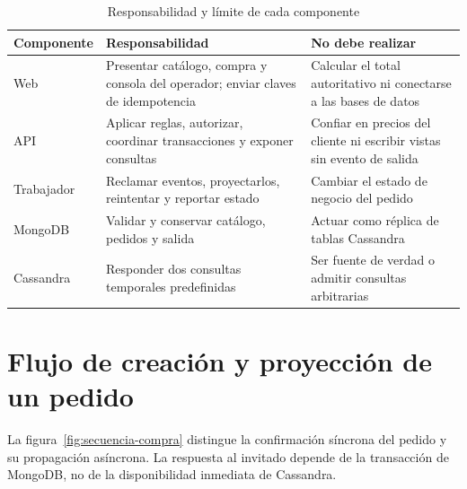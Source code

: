 \begin{table}[H]
  \centering
  \caption{Responsabilidad y límite de cada componente}
  \label{tab:componentes}
  \begin{tabularx}{\textwidth}{@{}p{3.2cm}YY@{}}
    \toprule
    \textbf{Componente} & \textbf{Responsabilidad} & \textbf{No debe realizar} \\
    \midrule
    Web & Presentar catálogo, compra y consola del operador; enviar claves de idempotencia & Calcular el total autoritativo ni conectarse a las bases de datos \\
    API & Aplicar reglas, autorizar, coordinar transacciones y exponer consultas & Confiar en precios del cliente ni escribir vistas sin evento de salida \\
    Trabajador & Reclamar eventos, proyectarlos, reintentar y reportar estado & Cambiar el estado de negocio del pedido \\
    MongoDB & Validar y conservar catálogo, pedidos y salida & Actuar como réplica de tablas Cassandra \\
    Cassandra & Responder dos consultas temporales predefinidas & Ser fuente de verdad o admitir consultas arbitrarias \\
    \bottomrule
  \end{tabularx}
\end{table}

\section{Flujo de creación y proyección de un pedido}

La figura~\ref{fig:secuencia-compra} distingue la confirmación síncrona del pedido y su propagación asíncrona. La respuesta al invitado depende de la transacción de MongoDB, no de la disponibilidad inmediata de Cassandra.

